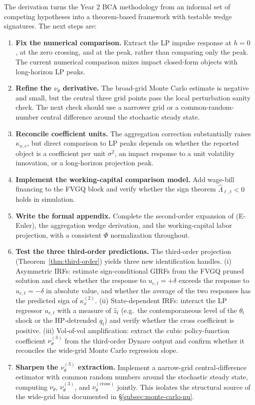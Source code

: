 \documentclass[11pt]{article}
\newcommand{\kxtwo}{\kappa_x^{(2)}}
\newcommand{\nuth}{\nu_\theta}
\newcommand{\nuthIII}{\nu_\theta^{(3)}}
\newcommand{\nuthx}{\nu_\theta^{(\mathrm{cross})}}
\theoremstyle{plain}
\theoremstyle{definition}
\begin{document}
The derivation turns the Year 2 BCA methodology from an informal set of
competing hypotheses into a theorem-based framework with testable wedge
signatures. The next steps are:
\begin{enumerate}
  \item \textbf{Fix the numerical comparison.} Extract the LP impulse response
  at $h=0$, at the zero crossing, and at the peak, rather than comparing only
  the peak. The current numerical comparison mixes impact closed-form objects
  with long-horizon LP peaks.

  \item \textbf{Refine the $\nu_\theta$ derivative.} The broad-grid Monte Carlo
  estimate is negative and small, but the central three grid points pass the
  local perturbation sanity check. The next check should use a narrower grid or
  a common-random-number central difference around the stochastic steady state.

  \item \textbf{Reconcile coefficient units.} The aggregation correction
  substantially raises $\kappa_{x,e}$, but direct comparison to LP peaks
  depends on whether the reported object is a coefficient per unit
  $\sigma^2$, an impact response to a unit volatility innovation, or a
  long-horizon projection peak.

  \item \textbf{Implement the working-capital comparison model.} Add wage-bill
  financing to the FVGQ block and verify whether the sign theorem
  $\hat\Lambda_{\ell,t}<0$ holds in simulation.

  \item \textbf{Write the formal appendix.} Complete the second-order expansion
  of (E-Euler), the aggregation wedge derivation, and the working-capital labor
  projection, with a consistent $\Phi$ normalization throughout.

  \item \textbf{Test the three third-order predictions.} The third-order
  projection (Theorem~\ref{thm:third-order}) yields three new identification
  handles. (i) Asymmetric IRFs: estimate sign-conditional GIRFs from the FVGQ
  pruned solution and check whether the response to $u_{e,t}=+\delta$ exceeds
  the response to $u_{e,t}=-\delta$ in absolute value, and whether the average
  of the two responses has the predicted sign of $\kxtwo$. (ii)
  State-dependent IRFs: interact the LP regressor $u_{e,t}$ with a measure of
  $\hat z_t$ (e.g.\ the contemporaneous level of the $\theta_t$ shock or the
  HP-detrended $q_t$) and verify whether the cross coefficient is positive.
  (iii) Vol-of-vol amplification: extract the cubic policy-function coefficient
  $\nuthIII$ from the third-order Dynare output and confirm whether it
  reconciles the wide-grid Monte Carlo regression slope.

  \item \textbf{Sharpen the $\nuthIII$ extraction.} Implement a narrow-grid
  central-difference estimator with common random numbers around the
  stochastic steady state, computing $\nuth$, $\nuthIII$, and $\nuthx$ jointly.
  This isolates the structural source of the wide-grid bias documented in
  §\ref{subsec:monte-carlo-nu}.
\end{enumerate}
\end{document}
